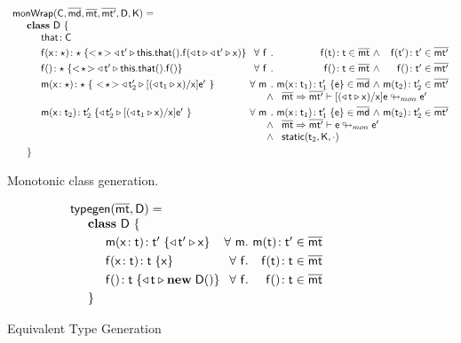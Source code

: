 \documentclass[a4paper,USenglish]{tex/lipics-v2016}
\begin{document}
\begin{figure}[!ht]
\hrulefill
\footnotesize
\[\begin{array}{l@{~}r@{}r@{~}r@{~}r@{~}rr}
\arrayrulecolor{white}
\classgen{\C, \b\md, \bmt, \bmtp, \D, \K}= \\
\SP \class~\D~\{ \\
\SPP \Fdef\that\C
\\[1mm]
\SPP \Mdef\f\x\any\any {\SubCast\any{\MonCast\tp{
      \Set{\Get\this\that}\f{\MonCast\t{\MonCast\tp\x}}}}}
&
\All f \Mtype\f\t\t\in\bmt &\wedge& \Mtype\f\tp\tp\in\bmtp
\\[1mm]\hline
\SPP \Mdefz\f\any{\SubCast\any{\MonCast\tp{\Get{\Get\this\that}\f}}}
&
 \All f \Mtype\f{}\t \in \bmt &\wedge& \Mtype\f{}\tp \in \bmtp
\\[1mm]\hline
\SPP \Mdef\m\x\any\any {~\SubCast\any{\MonCast{\tp[2]}{{[{(\MonCast{\t[1]}\x)}/\x]\ep}}}~}
&     \All \m \Mdef\m\x{\t[1]}{\tp[1]}\e\in\b\md &\wedge& \Mtype\m{\t[2]}{\tp[2]}\in\bmtp \\
&&\wedge&\multicolumn{3}{l}{\rtranstz{\bmt}\bmtp{[{(\MonCast\t\x)}/\x]\e}{\ep}}
\\[1mm]\hline
\SPP \Mdef\m\x{\t[2]}{\tp[2]} {\MonCast{\tp[2]}{[{(\MonCast{\t[1]}\x)}/\x]\ep}~}
&     \All \m \Mdef\m\x{\t[1]}{\tp[1]}\e\in\b\md &\wedge& \Mtype\m{\t[2]}{\tp[2]}\in\bmtp \\
&&\wedge&\multicolumn{3}{l}{\rtranstz{\bmt}\bmtp{\e}{\ep}} \\
&&\wedge&\multicolumn{3}{l}{\statictype{\t[2]}{\K}{\cdot}}
\\[1mm]\hline
\SP\}
\end{array}
\]
\hrulefill
\caption{Monotonic class generation.}\label{classgen}
\end{figure}

\begin{figure}
\hrulefill
\footnotesize
\vspace{4mm}
\[\begin{array}{l@{~}r@{}r@{~}r@{~}r@{~}rr}
\arrayrulecolor{white}
\typegen{\bmt}{\D} = \\
\SP \class~\D~\{
\\[1mm]
\SPP \Mdef\m\x\t\tp {{\MonCast\tp{\x}}} 
&
\All m \Mtype\m\t\tp\in\bmt
\\[1mm]\hline
\SPP \Mdef\f\x\t\t {\x}
&
\All f \Mtype\f\t\t\in\bmt
\\[1mm]\hline
\SPP \Mdefz\f\t{{\MonCast\t{\New\D{}}}}
&
 \All f \Mtype\f{}\t \in \bmt
\\[1mm]
\SP\}
\end{array}
\]
\hrulefill
\caption{Equivalent Type Generation} \label{typegen}
\end{figure}
\end{document}
